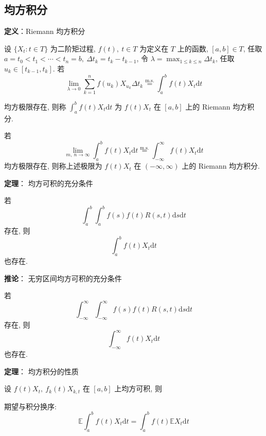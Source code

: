 \documentclass[openany]{ctexbook}
\theoremstyle{kaiti}
\theoremstyle{normal}
\begin{document}
\subsection{均方积分}

\textbf{定义}：Riemann 均方积分

设 $\{X_t:t\in T\}$ 为二阶矩过程, $f(t),~t\in T$ 为定义在 $T$ 上的函数, $[a,b]\in T$, 任取 $a=t_0<t_1<\cdots <t_n=b,~\Delta t_k=t_k-t_{k-1}$, 令 $\lambda=\max_{1\leqslant k\leqslant n}\Delta t_k$, 任取 $u_k\in[t_{k-1},t_k]$. 若
\begin{equation}
  \lim_{\lambda\to0}\sum_{k=1}^nf(u_k)X_{u_k}\Delta t_k\overset{\mathrm{m.s.}}{=}\int_a^bf(t)X_t\mathrm{d}t
\end{equation}

均方极限存在, 则称 $\displaystyle\int_a^bf(t)X_t\mathrm{d}t$ 为 $f(t)X_t$ 在 $[a,b]$ 上的 Riemann 均方积分.

若
\begin{equation}
  \lim_{m,~n\to\infty}\int_a^bf(t)X_t\mathrm{d}t\overset{\mathrm{m.s.}}{=}\int_{-\infty}^\infty f(t)X_t\mathrm{d}t
\end{equation}
 均方极限存在, 则称上述极限为 $f(t)X_t$ 在 $(-\infty,\infty)$ 上的 Riemann 均方积分.

\textbf{定理}： 均方可积的充分条件

若
\begin{equation}
  \int_a^b\int_a^bf(s)f(t)R(s,t)\mathrm{d}s\mathrm{d}t
\end{equation}
 存在, 则
\begin{equation}
  \int_a^bf(t)X_t\mathrm{d}t
\end{equation}
 也存在.

\textbf{推论}： 无穷区间均方可积的充分条件

若
\begin{equation}
  \int_{-\infty}^\infty\int_{-\infty}^\infty f(s)f(t)R(s,t)\mathrm{d}s\mathrm{d}t
\end{equation}
 存在, 则
\begin{equation}
  \int_{-\infty}^\infty f(t)X_t\mathrm{d}t
\end{equation}
 也存在.

\textbf{定理}： 均方积分的性质

设 $f(t)X_t,~f_k(t)X_{k,t}$ 在 $[a,b]$ 上均方可积, 则

期望与积分换序:
\begin{equation}
  \mathbb{E}\int_a^bf(t)X_t\mathrm{d}t=\int_a^bf(t)\mathbb{E}X_t\mathrm{d}t
\end{equation}
\end{document}
